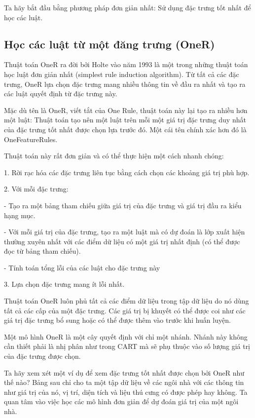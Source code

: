 Ta hãy bắt đầu bằng phương pháp đơn giản nhất: Sử dụng đặc trưng tốt nhất để học các luật.

\subsection{Học các luật từ một đăng trưng (OneR)}

Thuật toán OneR ra đời bởi Holte vào năm 1993 là một trong những thuật toán học luật đơn giản nhất (simplest rule induction algorithm). Từ tất cả các đặc trưng, OneR lựa chọn đặc trưng mang nhiều thông tin về đầu ra nhất và tạo ra các luật quyết định từ đặc trưng này.

Mặc dù tên là OneR, viết tắt của One Rule, thuật toán này lại tạo ra nhiều hơn một luật: Thuật toán tạo nên một luật trên mỗi một giá trị đặc trưng duy nhất của đặc trưng tốt nhất được chọn lựa trước đó. Một cái tên chính xác hơn đó là OneFeatureRules.

Thuật toán này rất đơn giản và có thể thực hiện một cách nhanh chóng:

1. Rời rạc hóa các đặc trưng liên tục bằng cách chọn các khoảng giá trị phù hợp.

2. Với mỗi đặc trưng: 

- Tạo ra một bảng tham chiếu giữa giá trị của đặc trưng và giá trị đầu ra kiểu hạng mục.

- Với mỗi giá trị của đặc trưng, tạo ra một luật mà có dự đoán là lớp xuất hiện thường xuyên nhất với các điểm dữ liệu có một giá trị nhất định (có thể được đọc từ bảng tham chiếu).

- Tính toán tổng lỗi của các luật cho đặc trưng này

3. Lựa chọn đặc trưng mang ít lỗi nhất.

Thuật toán OneR luôn phủ tất cả các điểm dữ liệu trong tập dữ liệu do nó dùng tất cả các cấp của một đặc trưng. Các giá trị bị khuyết có thể được coi như các giá trị đặc trưng bổ sung hoặc có thể được thêm vào trước khi huấn luyện.

Một mô hình OneR là một cây quyết định với chỉ một nhánh. Nhánh này không cần thiết phải là nhị phân như trong CART mà sẽ phụ thuộc vào số lượng giá trị của đặc trưng được chọn.

Ta hãy xem xét một ví dụ để xem đặc trưng tốt nhất được chọn bởi OneR như thế nào? Bảng sau chỉ cho ta một tập dữ liệu về các ngôi nhà với các thông tin như giá trị của nó, vị trí, diện tích và liệu thú cưng có được phép hay không. Ta quan tâm vào việc học các mô hình đơn giản để dự đoán giá trị của một ngôi nhà.

